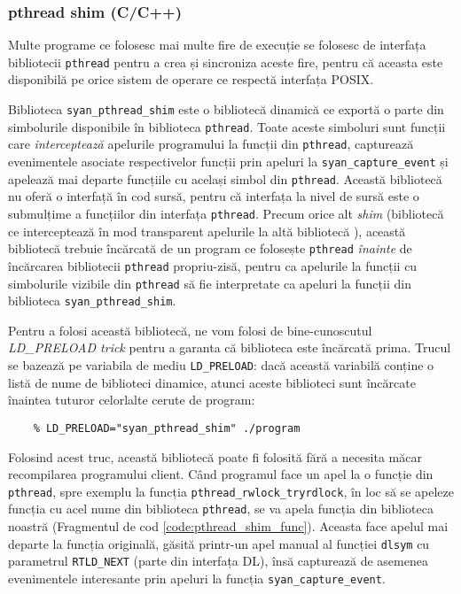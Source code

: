 \subsubsection{pthread shim (C/C++)}\label{section:pthread-shim}
Multe programe ce folosesc mai multe fire de execuție se folosesc de
interfața bibliotecii \lstinline{pthread} pentru a crea și sincroniza
aceste fire, pentru că aceasta este disponibilă pe orice sistem de
operare ce respectă interfața POSIX.

Biblioteca \lstinline{syan_pthread_shim} este o bibliotecă dinamică ce
exportă o parte din simbolurile disponibile în biblioteca
\lstinline{pthread}. Toate aceste simboluri sunt funcții care
\textit{interceptează} apelurile programului la funcții din
\lstinline{pthread}, capturează evenimentele asociate respectivelor
funcții prin apeluri la \lstinline{syan_capture_event} și apelează mai
departe funcțiile cu același simbol din \lstinline{pthread}. Această
bibliotecă nu oferă o interfață în cod sursă, pentru că interfața la
nivel de sursă este o submulțime a funcțiilor din interfața
\lstinline{pthread}. Precum orice alt \textit{shim} (bibliotecă ce
interceptează în mod transparent apelurile la altă bibliotecă
\cite{wiki:Shim_(computing)}), această bibliotecă trebuie încărcată de
un program ce folosește \lstinline{pthread} \textit{înainte} de
încărcarea bibliotecii \lstinline{pthread} propriu-zisă, pentru ca
apelurile la funcții cu simbolurile vizibile din \lstinline{pthread} să
fie interpretate ca apeluri la funcții din biblioteca
\lstinline{syan_pthread_shim}.

Pentru a folosi această bibliotecă, ne vom folosi de bine-cunoscutul
\textit{LD\_PRELOAD trick}\cite{LD_PRELOAD} pentru a garanta că
biblioteca este încărcată prima. Trucul se bazează pe variabila de mediu
\lstinline{LD_PRELOAD}: dacă această variabilă conține o listă de nume
de biblioteci dinamice, atunci aceste biblioteci sunt încărcate înaintea
tuturor celorlalte cerute de program:
\begin{lstlisting}
    % LD_PRELOAD="syan_pthread_shim" ./program
\end{lstlisting}
Folosind acest truc, această bibliotecă poate fi folosită fără a
necesita măcar recompilarea programului client. Când programul face
un apel la o funcție din \lstinline{pthread}, spre exemplu la funcția
\lstinline{pthread_rwlock_tryrdlock}, în loc să se apeleze funcția cu
acel nume din biblioteca \lstinline{pthread}, se va apela funcția din
biblioteca noastră (Fragmentul de cod \ref{code:pthread_shim_func}).
Aceasta face apelul mai departe la funcția originală, găsită printr-un
apel manual al funcției \lstinline{dlsym} cu parametrul
\lstinline{RTLD_NEXT} (parte din interfața DL\cite{DL}), însă capturează
de asemenea evenimentele interesante prin apeluri la funcția
\lstinline{syan_capture_event}.

